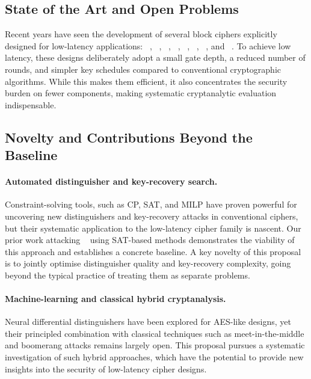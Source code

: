 \subsection{State of the Art and Open Problems}

Recent years have seen the development of several block ciphers explicitly designed for low-latency applications:
~\cite{DBLP:conf/asiacrypt/BorghoffCGKKKLNPRRTY12},
~\cite{DBLP:conf/sacrypt/BozilovEKLLMNRT20},
~\cite{DBLP:conf/crypto/BeierleJKL0PSSS16},
~\cite{DBLP:journals/tosc/Avanzi17},
~\cite{DBLP:journals/tosc/AvanziBDEGNR23},
~\cite{DBLP:conf/eurocrypt/BelkheyarDGLMPRSSAV25},
~\cite{DBLP:conf/uss/CanaleGLTTU23}, and
~\cite{cryptoeprint:2024/1240}.
To achieve low latency, these designs deliberately adopt a small gate depth, a reduced number of rounds, and simpler key schedules compared to conventional cryptographic algorithms.
While this makes them efficient, it also concentrates the security burden on fewer components, making systematic cryptanalytic evaluation indispensable.

\subsection{Novelty and Contributions Beyond the Baseline}

\paragraph{Automated distinguisher and key-recovery search.}
Constraint-solving tools, such as CP, SAT, and MILP have proven powerful for uncovering new distinguishers and key-recovery attacks in conventional ciphers, but their systematic application to the low-latency cipher family is nascent.
Our prior work attacking ~ using SAT-based methods demonstrates the viability of this approach and establishes a concrete baseline.
A key novelty of this proposal is to jointly optimise distinguisher quality and key-recovery complexity, going beyond the typical practice of treating them as separate problems.

\paragraph{Machine-learning and classical hybrid cryptanalysis.}
Neural differential distinguishers have been explored for AES-like designs, yet their principled combination with classical techniques such as meet-in-the-middle and boomerang attacks remains largely open.
This proposal pursues a systematic investigation of such hybrid approaches, which have the potential to provide new insights into the security of low-latency cipher designs.

